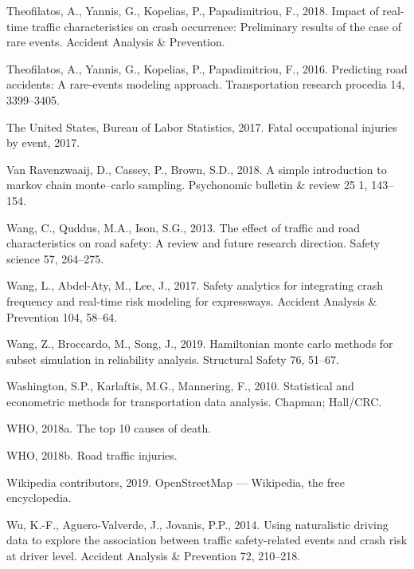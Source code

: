 \documentclass[12pt]{book}
\numberwithin{equation}{chapter}
\begin{document}
\leavevmode\hypertarget{ref-theofilatos2018impact}{}%
Theofilatos, A., Yannis, G., Kopelias, P., Papadimitriou, F., 2018. Impact of real-time traffic characteristics on crash occurrence: Preliminary results of the case of rare events. Accident Analysis \& Prevention.

\leavevmode\hypertarget{ref-theofilatos2016predicting}{}%
Theofilatos, A., Yannis, G., Kopelias, P., Papadimitriou, F., 2016. Predicting road accidents: A rare-events modeling approach. Transportation research procedia 14, 3399--3405.

\leavevmode\hypertarget{ref-bols}{}%
The United States, Bureau of Labor Statistics, 2017. Fatal occupational injuries by event, 2017.

\leavevmode\hypertarget{ref-van2018simple}{}%
Van Ravenzwaaij, D., Cassey, P., Brown, S.D., 2018. A simple introduction to markov chain monte--carlo sampling. Psychonomic bulletin \& review 25 1, 143--154.

\leavevmode\hypertarget{ref-wang2013effect}{}%
Wang, C., Quddus, M.A., Ison, S.G., 2013. The effect of traffic and road characteristics on road safety: A review and future research direction. Safety science 57, 264--275.

\leavevmode\hypertarget{ref-wang2017safety}{}%
Wang, L., Abdel-Aty, M., Lee, J., 2017. Safety analytics for integrating crash frequency and real-time risk modeling for expressways. Accident Analysis \& Prevention 104, 58--64.

\leavevmode\hypertarget{ref-wang2019hamiltonian}{}%
Wang, Z., Broccardo, M., Song, J., 2019. Hamiltonian monte carlo methods for subset simulation in reliability analysis. Structural Safety 76, 51--67.

\leavevmode\hypertarget{ref-washington2010statistical}{}%
Washington, S.P., Karlaftis, M.G., Mannering, F., 2010. Statistical and econometric methods for transportation data analysis. Chapman; Hall/CRC.

\leavevmode\hypertarget{ref-who2018}{}%
WHO, 2018a. The top 10 causes of death.

\leavevmode\hypertarget{ref-who2018b}{}%
WHO, 2018b. Road traffic injuries.

\leavevmode\hypertarget{ref-wikiOSM}{}%
Wikipedia contributors, 2019. OpenStreetMap --- Wikipedia, the free encyclopedia.

\leavevmode\hypertarget{ref-wu2014using}{}%
Wu, K.-F., Aguero-Valverde, J., Jovanis, P.P., 2014. Using naturalistic driving data to explore the association between traffic safety-related events and crash risk at driver level. Accident Analysis \& Prevention 72, 210--218.
\end{document}
